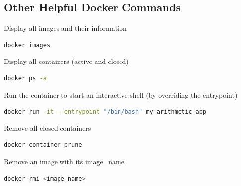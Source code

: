 \documentclass[a4paper,12pt]{article}
\begin{document}
\subsection{Other Helpful Docker Commands}


\hspace{0.5cm}
Display all images and their information
\begin{lstlisting}[language=bash, basicstyle=\ttfamily\footnotesize, frame=single, breaklines=true]
docker images
\end{lstlisting}

Display all containers (active and closed)
\begin{lstlisting}[language=bash, basicstyle=\ttfamily\footnotesize, frame=single, breaklines=true]
docker ps -a
\end{lstlisting}

Run the container to start an interactive shell (by overriding the entrypoint)
\begin{lstlisting}[language=bash, basicstyle=\ttfamily\footnotesize, frame=single, breaklines=true]
docker run -it --entrypoint "/bin/bash" my-arithmetic-app
\end{lstlisting}

Remove all closed containers
\begin{lstlisting}[language=bash, basicstyle=\ttfamily\footnotesize, frame=single, breaklines=true]
docker container prune
\end{lstlisting}

Remove an image with its image\_name
\begin{lstlisting}[language=bash, basicstyle=\ttfamily\footnotesize, frame=single, breaklines=true]
docker rmi <image_name>
\end{lstlisting}
\end{document}
